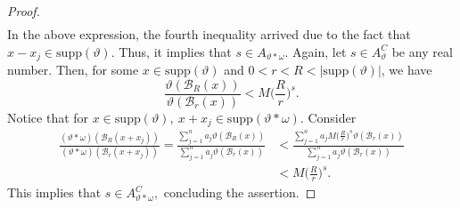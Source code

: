 \documentclass[10pt,a4paper]{amsart}
\begin{document}
\begin{proof}
\begin{equation*}
\begin{aligned}
    \end{aligned}
\end{equation*}
In the above expression, the fourth inequality arrived due to the fact that $ x-x_j \in \text{supp}(\vartheta).$ Thus, it implies that $s \in A_{\vartheta * \omega}.$
Again, let $s \in A_{\vartheta}^C$ be any real number. Then, for some $x \in \text{supp}(\vartheta)$ and $0< r< R< |\text{supp}(\vartheta)|$, we have 
$$  \frac{\vartheta(\mathcal{B}_R(x))}{\vartheta(\mathcal{B}_r(x))} < M\bigg(\frac{R}{r}\bigg)^s.$$
Notice that for $x \in \text{supp}(\vartheta),~ x +x_j \in \text{supp}(\vartheta * \omega).$ Consider 
\begin{equation*}
   \begin{aligned}
        \frac{(\vartheta * \omega)(\mathcal{B}_R(x+x_j))}{(\vartheta * \omega)(\mathcal{B}_r(x+x_j))} = \frac{\sum_{j=1}^n a_j \vartheta(\mathcal{B}_R(x))}{\sum_{j=1}^n a_j \vartheta( \mathcal{B}_r(x))} &< \frac{\sum_{j=1}^n a_j M \bigg(\frac{R}{r}\bigg)^s \vartheta(\mathcal{B}_r(x))}{\sum_{j=1}^n a_j \vartheta( \mathcal{B}_r(x))} \\& < M \bigg(\frac{R}{r}\bigg)^s.
   \end{aligned} 
\end{equation*}
This implies that $s \in A_{\vartheta *\omega}^C,$ concluding the assertion.
\end{proof}
\end{document}

